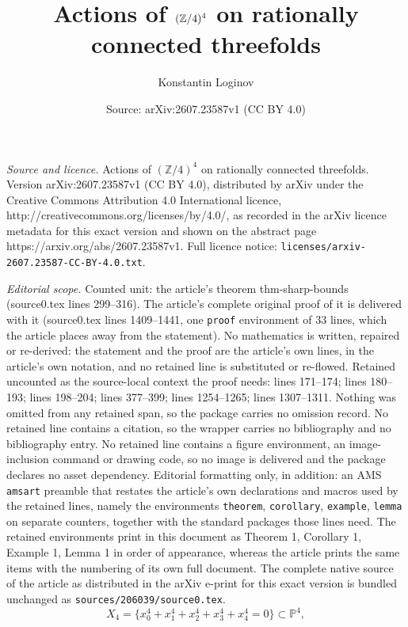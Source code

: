 \documentclass[10pt,a4paper]{amsart}
\title{Actions of $(\Z/4)^4$ on rationally connected threefolds}
\author{Konstantin Loginov}
\date{Source: arXiv:2607.23587v1 (CC BY 4.0)}
\newcommand{\PP}{\mathbb P}
\newcommand{\Z}{\mathbb Z}
\begin{document}
\maketitle

\noindent\emph{Source and licence.} Actions of $(\Z/4)^4$ on rationally connected threefolds. Version arXiv:2607.23587v1 (CC BY 4.0), distributed by arXiv under the Creative Commons Attribution 4.0 International licence, http://creativecommons.org/licenses/by/4.0/, as recorded in the arXiv licence metadata for this exact version and shown on the abstract page https://arxiv.org/abs/2607.23587v1. Full licence notice: \texttt{licenses/arxiv-2607.23587-CC-BY-4.0.txt}.\par\smallskip

\noindent\textit{Editorial scope.} Counted unit: the article's theorem thm-sharp-bounds (source0.tex lines 299--316). The article's complete original proof of it is delivered with it (source0.tex lines 1409--1441, one \texttt{proof} environment of 33 lines, which the article places away from the statement). No mathematics is written, repaired or re-derived: the statement and the proof are the article's own lines, in the article's own notation, and no retained line is substituted or re-flowed.  Retained uncounted as the source-local context the proof needs: lines 171--174; lines 180--193; lines 198--204; lines 377--399; lines 1254--1265; lines 1307--1311.  Nothing was omitted from any retained span, so the package carries no omission record.  No retained line contains a citation, so the wrapper carries no bibliography and no bibliography entry.  No retained line contains a figure environment, an image-inclusion command or drawing code, so no image is delivered and the package declares no asset dependency.  Editorial formatting only, in addition: an AMS \texttt{amsart} preamble that restates the article's own declarations and macros used by the retained lines, namely the environments \texttt{theorem}, \texttt{corollary}, \texttt{example}, \texttt{lemma} on separate counters, together with the standard packages those lines need.  The retained environments print in this document as Theorem 1, Corollary 1, Example 1, Lemma 1 in order of appearance, whereas the article prints the same items with the numbering of its own full document.  The complete native source of the article as distributed in the arXiv e-print for this exact version is bundled unchanged as \texttt{sources/206039/source0.tex}.
\begin{equation}
\label{eq-fermat}
X_4=\{x_0^4+x_1^4+x_2^4+x_3^4+x_4^4=0\}\subset\PP^4,
\end{equation}
\end{document}
